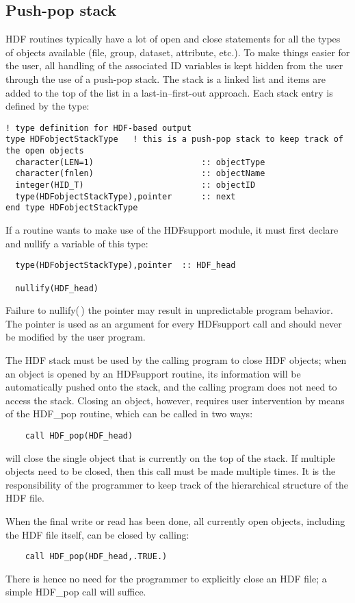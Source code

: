 \documentclass[DIV=calc, paper=letter, fontsize=11pt]{scrartcl}	 %
\begin{document}
\subsection{Push-pop stack}
HDF routines typically have a lot of \textsf{open} and \textsf{close} statements for all the types 
of objects available (file, group, dataset, attribute, etc.).  To make things easier for the user, 
all handling of the associated ID variables is kept hidden from the user through the use of a push-pop
stack.  The stack is a linked list and items are added to the top of the list in a \textsf{last-in--first-out}
approach.  Each stack entry is defined by the type:
\begin{verbatim}
! type definition for HDF-based output
type HDFobjectStackType   ! this is a push-pop stack to keep track of the open objects
  character(LEN=1)						:: objectType
  character(fnlen)						:: objectName
  integer(HID_T) 						:: objectID
  type(HDFobjectStackType),pointer		:: next
end type HDFobjectStackType
\end{verbatim}
If a routine wants to make use of the \textsf{HDFsupport} module, it must first declare
and nullify a variable of this type:
\begin{verbatim}
  type(HDFobjectStackType),pointer  :: HDF_head

  nullify(HDF_head)
\end{verbatim}
Failure to \textsf{nullify(\,)} the pointer may result in unpredictable program behavior.  The  
pointer is used as an argument for every \textsf{HDFsupport} call and should never be modified by the user 
program. 

The HDF stack must be used by the calling program to close HDF objects; when an object is opened 
by an \textsf{HDFsupport} routine, its information will be automatically pushed onto the stack, and the 
calling program does not need to access the stack.  Closing an object, however, requires user intervention
by means of the \textsf{HDF\_pop} routine, which can be called in two ways:
\begin{verbatim}
	call HDF_pop(HDF_head)
\end{verbatim}
will close the single object that is currently on the top of the stack. If multiple objects need to
be closed, then this call must be made multiple times.  It is the responsibility of the programmer to 
keep track of the hierarchical structure of the HDF file.

When the final write or read has been done, all currently open objects, including the HDF file itself, can
be closed by calling:
\begin{verbatim}
	call HDF_pop(HDF_head,.TRUE.)
\end{verbatim}
There is hence no need for the programmer to explicitly close an HDF file; a simple \textsf{HDF\_pop} call
will suffice.
\end{document}
